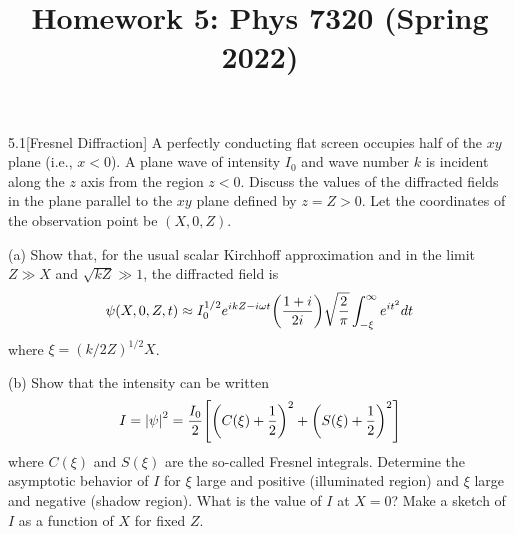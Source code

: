 \documentclass[12pt]{article}
\title{Homework 5: Phys 7320 (Spring 2022)}
\begin{document}
\maketitle
\begin{problem}{5.1}[Fresnel Diffraction]
A perfectly conducting flat screen occupies half of the $xy$ plane (i.e.,
$x<0$). A plane wave of intensity $I_0$ and wave number $k$ is incident along
the $z$ axis from the region $z<0$. Discuss the values of the diffracted fields
in the plane parallel to the $xy$ plane defined by $z=Z>0$. Let the coordinates
of the observation point be $(X,0,Z)$.

(a) Show that, for the usual scalar Kirchhoff approximation and in the limit
$Z\gg X$ and $\sqrt{kZ}\gg1$, the diffracted field is
\begin{equation}
    \psi(X,0,Z,t)\approx
    I_0^{1/2}e^{ikZ-i\omega t}\qty(\frac{1+i}{2i})
    \sqrt{\frac2\pi}\int_{-\xi}^\infty e^{it^2}dt
\end{equation}
where $\xi=(k/2Z)^{1/2}X$.

(b) Show that the intensity can be written
\begin{equation}
    I=\abs{\psi}^2=\frac{I_0}{2}\qty[\qty(C(\xi)+\frac12)^2+\qty(S(\xi)+\frac12)^2] 
\end{equation}
where $C(\xi)$ and $S(\xi)$ are the so-called Fresnel integrals. Determine the
asymptotic behavior of $I$ for $\xi$ large and positive (illuminated region) and
$\xi$ large and negative (shadow region). What is the value of $I$ at $X=0$?
Make a sketch of $I$ as a function of $X$ for fixed $Z$.


\end{problem}
\end{document}
